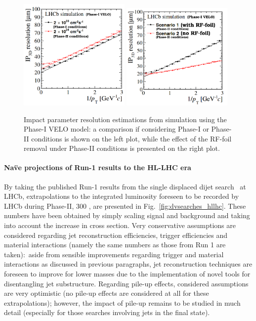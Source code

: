 \begin{figure}[t]
\centerline{
\includegraphics[width=0.48\textwidth]{figures/velo_ph21.png}
\includegraphics[width=0.48\textwidth]{figures/velo_ph22.png}
}
  \caption{Impact parameter resolution estimations from simulation using the Phase-I VELO model: a comparison if considering Phase-I or Phase-II conditions is shown on the left plot, while the effect of the RF-foil removal under Phase-II conditions is presented on the right plot.}
  \label{fig:veloip_hllhc}
\end{figure}

\paragraph{Na\"ve projections of Run-1 results to the HL-LHC era}

By taking the published Run-1 results from the single displaced dijet search~\cite{Aaij:2017mic} at LHCb, extrapolations to the integrated luminosity foreseen to be recorded by LHCb during Phase-II, 300 \invfb, are presented in Fig.~\ref{fig:dvsearches_hllhc}. These numbers have been obtained by simply scaling signal and background and taking into account the increase in cross section. Very conservative assumptions are considered regarding jet reconstruction efficiencies, trigger efficiencies and material interactions (namely the same numbers as those from Run 1 are taken):~aside from sensible improvements regarding trigger and material interactions as discussed in previous paragraphs, jet reconstruction techniques are foreseen to improve for lower masses due to the implementation of novel tools for disentangling jet substructure. Regarding pile-up effects, considered assumptions are very optimistic (no pile-up effects are considered at all for these extrapolations); however, the impact of pile-up remains to be studied in much detail (especially for those searches involving jets in the final state). 

